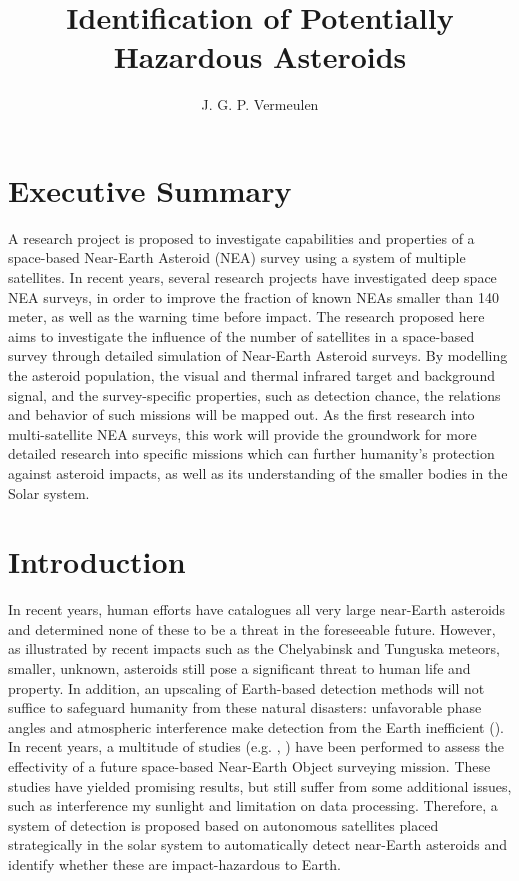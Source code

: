 \documentclass[12pt, english, NoHyper]{AE4010-template}
\title{Identification of Potentially Hazardous Asteroids}
\author{J. G. P. Vermeulen}
\begin{document}
\maketitle

\section*{Executive Summary}
A research project is proposed to investigate capabilities and properties of a space-based Near-Earth Asteroid (NEA) survey using a system of multiple satellites. In recent years, several research projects have investigated deep space NEA surveys, in order to improve the fraction of known NEAs smaller than 140 meter, as well as the warning time before impact. The research proposed here aims to investigate the influence of the number of satellites in a space-based survey through detailed simulation of Near-Earth Asteroid surveys. By modelling the asteroid population, the visual and thermal infrared target and background signal, and the survey-specific properties, such as detection chance, the relations and behavior of such missions will be mapped out. As the first research into multi-satellite NEA surveys, this work will provide the groundwork for more detailed research into specific missions which can further humanity's protection against asteroid impacts, as well as its understanding of the smaller bodies in the Solar system.




\section{Introduction}
In recent years, human efforts have catalogues all very large near-Earth asteroids and determined none of these to be a threat in the foreseeable future. However, as illustrated by recent impacts such as the Chelyabinsk and Tunguska meteors, smaller, unknown, asteroids still pose a significant threat to human life and property. In addition, an upscaling of Earth-based detection methods will not suffice to safeguard humanity from these natural disasters: unfavorable phase angles and atmospheric interference make detection from the Earth inefficient (\cite{DefendingPlanetEarth}). In recent years, a multitude of studies (e.g. \cite{NEOSDT1}, \cite{ThesisOlga}) have been performed to assess the effectivity of a future space-based Near-Earth Object surveying mission. These studies have yielded promising results, but still suffer from some additional issues, such as interference my sunlight and limitation on data processing. Therefore, a system of detection is proposed based on autonomous satellites placed strategically in the solar system to automatically detect near-Earth asteroids and identify whether these are impact-hazardous to Earth. \\
\end{document}
